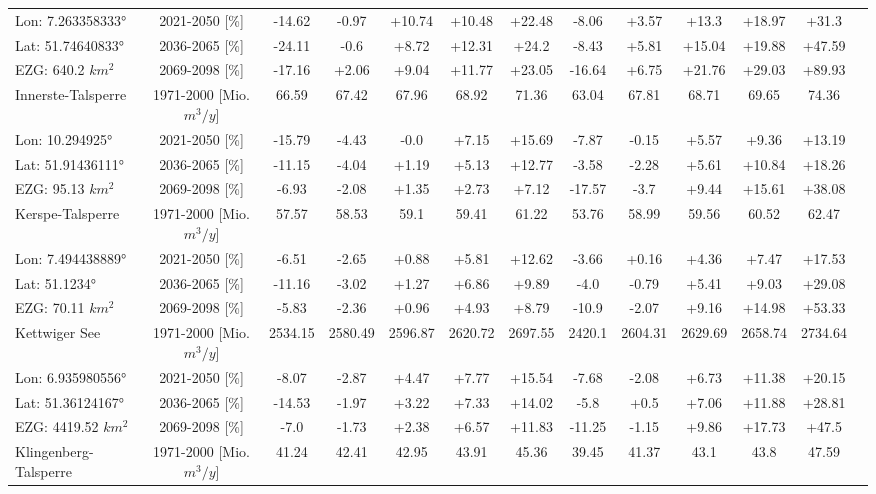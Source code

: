 \begin{longtable}{@{\extracolsep{\fill}}lc|ccccc||cccccc}
\cline{2-13} 
Lon: 7.263358333° & 2021-2050 [\%]  & -14.62 & -0.97 & +10.74 & +10.48 & +22.48 & -8.06 & +3.57 & +13.3 & +18.97 & +31.3 & \\ 
Lat: 51.74640833° & 2036-2065 [\%]  & -24.11 & -0.6 & +8.72 & +12.31 & +24.2 & -8.43 & +5.81 & +15.04 & +19.88 & +47.59 & \\ 
EZG: 640.2 $km^2$ & 2069-2098 [\%]  & -17.16 & +2.06 & +9.04 & +11.77 & +23.05 & -16.64 & +6.75 & +21.76 & +29.03 & +89.93 & \\ 
\hline 
Innerste-Talsperre & 1971-2000 [Mio. $m^3/y$]  & 66.59 & 67.42 & 67.96 & 68.92 & 71.36 & 63.04 & 67.81 & 68.71 & 69.65 & 74.36 & \\ 
\cline{2-13} 
Lon: 10.294925° & 2021-2050 [\%]  & -15.79 & -4.43 & -0.0 & +7.15 & +15.69 & -7.87 & -0.15 & +5.57 & +9.36 & +13.19 & \\ 
Lat: 51.91436111° & 2036-2065 [\%]  & -11.15 & -4.04 & +1.19 & +5.13 & +12.77 & -3.58 & -2.28 & +5.61 & +10.84 & +18.26 & \\ 
EZG: 95.13 $km^2$ & 2069-2098 [\%]  & -6.93 & -2.08 & +1.35 & +2.73 & +7.12 & -17.57 & -3.7 & +9.44 & +15.61 & +38.08 & \\ 
\hline 
Kerspe-Talsperre & 1971-2000 [Mio. $m^3/y$]  & 57.57 & 58.53 & 59.1 & 59.41 & 61.22 & 53.76 & 58.99 & 59.56 & 60.52 & 62.47 & \\ 
\cline{2-13} 
Lon: 7.494438889° & 2021-2050 [\%]  & -6.51 & -2.65 & +0.88 & +5.81 & +12.62 & -3.66 & +0.16 & +4.36 & +7.47 & +17.53 & \\ 
Lat: 51.1234° & 2036-2065 [\%]  & -11.16 & -3.02 & +1.27 & +6.86 & +9.89 & -4.0 & -0.79 & +5.41 & +9.03 & +29.08 & \\ 
EZG: 70.11 $km^2$ & 2069-2098 [\%]  & -5.83 & -2.36 & +0.96 & +4.93 & +8.79 & -10.9 & -2.07 & +9.16 & +14.98 & +53.33 & \\ 
\hline 
Kettwiger See & 1971-2000 [Mio. $m^3/y$]  & 2534.15 & 2580.49 & 2596.87 & 2620.72 & 2697.55 & 2420.1 & 2604.31 & 2629.69 & 2658.74 & 2734.64 & \\ 
\cline{2-13} 
Lon: 6.935980556° & 2021-2050 [\%]  & -8.07 & -2.87 & +4.47 & +7.77 & +15.54 & -7.68 & -2.08 & +6.73 & +11.38 & +20.15 & \\ 
Lat: 51.36124167° & 2036-2065 [\%]  & -14.53 & -1.97 & +3.22 & +7.33 & +14.02 & -5.8 & +0.5 & +7.06 & +11.88 & +28.81 & \\ 
EZG: 4419.52 $km^2$ & 2069-2098 [\%]  & -7.0 & -1.73 & +2.38 & +6.57 & +11.83 & -11.25 & -1.15 & +9.86 & +17.73 & +47.5 & \\ 
\hline 
Klingenberg-Talsperre & 1971-2000 [Mio. $m^3/y$]  & 41.24 & 42.41 & 42.95 & 43.91 & 45.36 & 39.45 & 41.37 & 43.1 & 43.8 & 47.59 & \\ 

\end{longtable}
